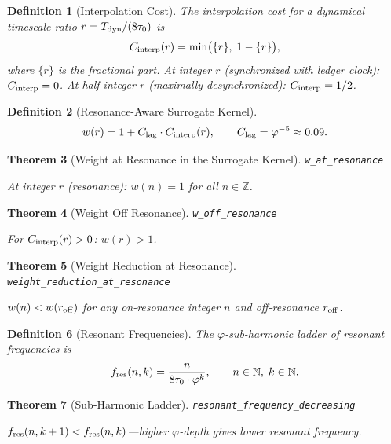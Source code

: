 \documentclass[11pt,a4paper]{article}
\newtheorem{theorem}{Theorem}[section]
\newtheorem{definition}[theorem]{Definition}
\newcommand{\lean}[1]{\texttt{\small #1}}
\begin{document}
\begin{definition}[Interpolation Cost]
The \emph{interpolation cost} for a dynamical timescale ratio $r = T_{\rm dyn}/(8\tau_0)$ is
\begin{equation}
    C_{\rm interp}(r) = \min\bigl(\{r\},\; 1 - \{r\}\bigr),
\end{equation}
where $\{r\}$ is the fractional part.
At integer $r$ (synchronized with ledger clock): $C_{\rm interp} = 0$.
At half-integer $r$ (maximally desynchronized): $C_{\rm interp} = 1/2$.
\end{definition}

\begin{definition}[Resonance-Aware Surrogate Kernel]
\begin{equation}\label{eq:w-resonant}
    w(r) = 1 + C_{\rm lag} \cdot C_{\rm interp}(r), \qquad C_{\rm lag} = \varphi^{-5} \approx 0.09.
\end{equation}
\end{definition}

\begin{theorem}[Weight at Resonance in the Surrogate Kernel]
\lean{w\_at\_resonance}

At integer $r$ (resonance): $w(n) = 1$ for all $n \in \mathbb{Z}$.
\end{theorem}

\begin{theorem}[Weight Off Resonance]
\lean{w\_off\_resonance}

For $C_{\rm interp}(r) > 0$: $w(r) > 1$.
\end{theorem}

\begin{theorem}[Weight Reduction at Resonance]
\lean{weight\_reduction\_at\_resonance}

$w(n) < w(r_{\rm off})$ for any on-resonance integer $n$ and off-resonance $r_{\rm off}$.
\end{theorem}

\begin{definition}[Resonant Frequencies]
The $\varphi$-sub-harmonic ladder of resonant frequencies is
\begin{equation}
    f_{\rm res}(n, k) = \frac{n}{8\tau_0 \cdot \varphi^k}, \qquad n \in \mathbb{N},\; k \in \mathbb{N}.
\end{equation}
\end{definition}

\begin{theorem}[Sub-Harmonic Ladder]
\lean{resonant\_frequency\_decreasing}

$f_{\rm res}(n, k+1) < f_{\rm res}(n, k)$---higher $\varphi$-depth gives lower resonant frequency.
\end{theorem}
\end{document}
